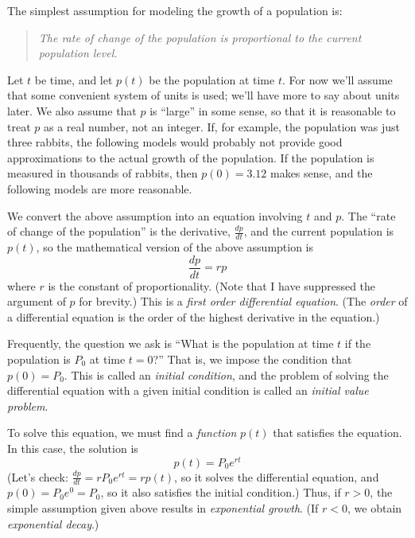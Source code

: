 \documentclass{book}
\begin{document}
The simplest assumption for modeling the growth of a population
is:
\begin{quote}
\emph{The rate of change of the population is proportional to the current population level.}
\end{quote} 
Let $t$ be time, and let $p(t)$ be the population at time $t$.
For now we'll assume that some convenient system of units is used;
we'll have more to say about units later.
We also assume that $p$ is ``large'' in some sense, so that it is reasonable
to treat $p$ as a real number, not an integer.  If, for example, the population
was just three rabbits, the following models would probably not provide good
approximations to the actual growth of the population.  If the population
is measured in thousands of rabbits, then $p(0)=3.12$ makes sense,
and the following models are more reasonable.

We convert the above assumption into an equation involving $t$
and $p$.
The ``rate of change of the population'' is the derivative, $\frac{dp}{dt}$, and the
current population is $p(t)$, so the mathematical version of the above
assumption is
\begin{equation}
  \frac{dp}{dt} = rp
\end{equation}
where $r$ is the constant of proportionality.
(Note that I have suppressed the argument of $p$ for brevity.)
This is a \emph{first order differential equation}.
(The \emph{order} of a differential equation is the order of the
highest derivative in the equation.)

Frequently, the question we ask is ``What is the population at time $t$
if the population is $P_0$ at time $t=0$?''  That is, we impose the
condition that $p(0)=P_0$.  This is called an
\emph{initial condition}, and the problem of solving the differential
equation with a given initial condition is called an
\emph{initial value problem}.

To solve this equation, we must find a \emph{function} $p(t)$
that satisfies the equation.  In this case, the solution is
\begin{equation}
  p(t) = P_0 e^{rt}
\end{equation}
(Let's check:  $\frac{dp}{dt} = rP_0e^{rt} = r p(t)$, so  it solves the differential
equation, and $p(0) = P_0e^0 = P_0$, so it also satisfies the initial condition.)
Thus, if $r > 0$, the simple assumption given above results in
\emph{exponential growth}.
(If $r < 0$, we obtain \emph{exponential decay}.)
\end{document}
